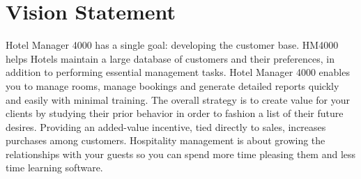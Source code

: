 \section{Vision Statement}
Hotel Manager 4000 has a single goal: developing the customer base. HM4000 helps Hotels maintain a large database of customers and their preferences, in addition to performing essential management tasks. Hotel Manager 4000 enables you to manage rooms, manage bookings and generate detailed reports quickly and easily with minimal training. The overall strategy is to create value for your clients by studying their prior behavior in order to fashion a list of their future desires. Providing an added-value incentive, tied directly to sales, increases purchases among customers. Hospitality management is about growing the relationships with your guests so you can spend more time pleasing them and less time learning software.
